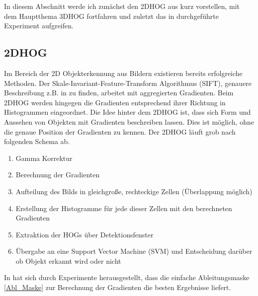 In diesem Abschnitt werde ich zunächst den 2DHOG aus \cite{dalal2005histograms} kurz vorstellen, mit dem Hauptthema 3DHOG fortfahren und zuletzt das in \cite{scherer2010histograms} durchgeführte Experiment aufgreifen.

\subsection{2DHOG}
Im Bereich der 2D Objekterkennung aus Bildern existieren bereits erfolgreiche Methoden. Der Skale-Invariant-Feature-Transform Algorithmus (SIFT), genauere Beschreibung z.B. in \cite{Priese15}
zu finden, arbeitet mit aggregierten Gradienten. Beim 2DHOG werden hingegen die Gradienten entsprechend
ihrer Richtung in Histogrammen eingeordnet.
\newline
Die Idee hinter dem 2DHOG ist, dass sich Form und Aussehen von Objekten mit Gradienten beschreiben lassen.
Dies ist möglich, ohne die genaue Position der Gradienten zu kennen. Der 2DHOG läuft grob nach folgenden Schema ab. 
\begin{enumerate} 
	\item Gamma Korrektur
	\item Berechnung der Gradienten
	\item Aufteilung des Bilds in gleichgroße, rechteckige Zellen (Überlappung möglich)
	\item Erstellung der Histogramme für jede dieser Zellen mit den berechneten Gradienten
	\item Extraktion der HOGs über Detektionsfenster
	\item Übergabe an eine Support Vector Machine (SVM) und Entscheidung darüber ob Objekt erkannt wird oder nicht
	
\end{enumerate}



In \cite{dalal2005histograms} hat sich durch Experimente herausgestellt, dass die einfache Ableitungsmaske \ref{Abl_Maske} zur Berechnung der Gradienten die besten Ergebnisse liefert. 

